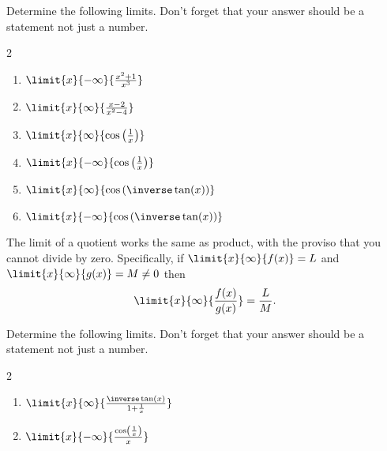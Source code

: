     
    
    
\begin{ProblemSection}
  \begin{embeddedproblem}{}
    Determine the following limits.  Don't forget that your answer
    should be a statement not just a number.
    \begin{multicols}{2}
      \begin{enumerate}[label={\bf{}(\alph*)}]
      \item $\limit{x}{-\infty}{\frac{x^2+1}{x^3}}$
      \item $\limit{x}{ \infty}{\frac{x-2}{x^2-4}}$
      \item $\limit{x}{ \infty}{\cos\left(\frac1x\right)}$
      \item $\limit{x}{-\infty}{\cos\left(\frac1x\right)}$
      \item $\limit{x}{ \infty}{\cos\left(\inverse\tan(x)\right)}$
      \item $\limit{x}{-\infty}{\cos\left(\inverse\tan(x)\right)}$
      \end{enumerate}
    \end{multicols}
  \end{embeddedproblem}
    The limit of a quotient works the same as product, with the
    proviso that you cannot divide by zero.  Specifically, if
    $\limit{x}{\infty}{f(x)}=L$ and $\limit{x}{\infty}{g(x)}=M\ne0$
    then
    $$
    \limit{x}{\infty}{\frac{f(x)}{g(x)}}=\frac{L}{M}.
    $$
    \begin{embeddedproblem}{}
      Determine the following limits.  Don't forget that your answer
      should be a statement not just a number.
      \begin{multicols}{2}
        \begin{enumerate}[label={\bf{}(\alph*)}]
        \item $\limit{x}{\infty}{\frac{\inverse\tan(x)}{1+\frac1x}}$
        \item $\limit{x}{-\infty}{\frac{\cos\left(\frac1x\right)}{x}}$
        \end{enumerate}
      \end{multicols}
    \end{embeddedproblem}
\end{ProblemSection}

